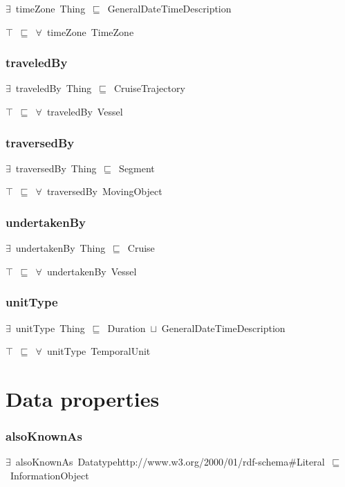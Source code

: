 \documentclass{article}
\begin{document}
\ensuremath{\exists}~timeZone~Thing~\ensuremath{\sqsubseteq}~GeneralDateTimeDescription

\ensuremath{\top}~\ensuremath{\sqsubseteq}~\ensuremath{\forall}~timeZone~TimeZone

\subsubsection*{traveledBy}

\ensuremath{\exists}~traveledBy~Thing~\ensuremath{\sqsubseteq}~CruiseTrajectory

\ensuremath{\top}~\ensuremath{\sqsubseteq}~\ensuremath{\forall}~traveledBy~Vessel

\subsubsection*{traversedBy}

\ensuremath{\exists}~traversedBy~Thing~\ensuremath{\sqsubseteq}~Segment

\ensuremath{\top}~\ensuremath{\sqsubseteq}~\ensuremath{\forall}~traversedBy~MovingObject

\subsubsection*{undertakenBy}

\ensuremath{\exists}~undertakenBy~Thing~\ensuremath{\sqsubseteq}~Cruise

\ensuremath{\top}~\ensuremath{\sqsubseteq}~\ensuremath{\forall}~undertakenBy~Vessel

\subsubsection*{unitType}

\ensuremath{\exists}~unitType~Thing~\ensuremath{\sqsubseteq}~Duration~\ensuremath{\sqcup}~GeneralDateTimeDescription

\ensuremath{\top}~\ensuremath{\sqsubseteq}~\ensuremath{\forall}~unitType~TemporalUnit

\section*{Data properties}\subsubsection*{alsoKnownAs}

\ensuremath{\exists}~alsoKnownAs~Datatypehttp://www.w3.org/2000/01/rdf-schema#Literal~\ensuremath{\sqsubseteq}~InformationObject
\end{document}

